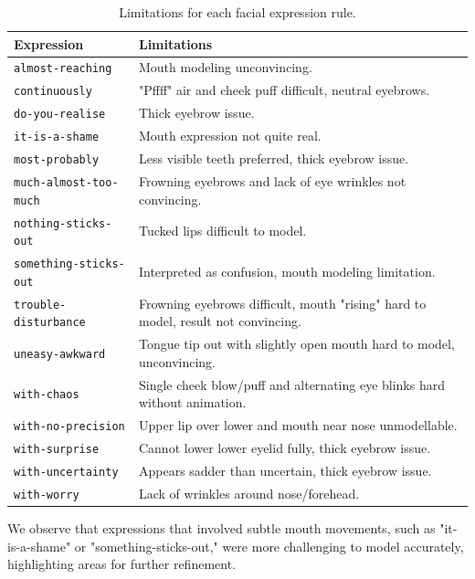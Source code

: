 \documentclass[../../main.tex]{subfiles}
\begin{document}
\begin{table}
    \centering
    \begin{tabular}{|l|p{8cm}|}
    \hline
    \textbf{Expression} & \textbf{Limitations} \\
    \hline
    \texttt{almost-reaching} & Mouth modeling unconvincing. \\
    \hline
    \texttt{continuously} & "Pffff" air and cheek puff difficult, neutral eyebrows. \\
    \hline
    \texttt{do-you-realise} & Thick eyebrow issue. \\
    \hline
    \texttt{it-is-a-shame} & Mouth expression not quite real. \\
    \hline
    \texttt{most-probably} & Less visible teeth preferred, thick eyebrow issue. \\
    \hline
    \texttt{much-almost-too-much} & Frowning eyebrows and lack of eye wrinkles not convincing. \\
    \hline
    \texttt{nothing-sticks-out} & Tucked lips difficult to model. \\
    \hline
   \texttt{something-sticks-out} & Interpreted as confusion, mouth modeling limitation. \\
    \hline
    \texttt{trouble-disturbance} & Frowning eyebrows difficult, mouth "rising" hard to model, result not convincing. \\
    \hline
    \texttt{uneasy-awkward} & Tongue tip out with slightly open mouth hard to model, unconvincing. \\
    \hline
    \texttt{with-chaos} & Single cheek blow/puff and alternating eye blinks hard without animation. \\
    \hline
    \texttt{with-no-precision} & Upper lip over lower and mouth near nose unmodellable. \\
    \hline
    \texttt{with-surprise} & Cannot lower lower eyelid fully, thick eyebrow issue. \\
    \hline
    \texttt{with-uncertainty} & Appears sadder than uncertain, thick eyebrow issue. \\
    \hline
    \texttt{with-worry} & Lack of wrinkles around nose/forehead. \\
    \hline
    \end{tabular}
    \caption{Limitations for each facial expression rule.}
    \label{tab:facial_expressions_evaluation}
\end{table}

We observe that expressions that involved subtle mouth movements, such as "it-is-a-shame" or "something-sticks-out," were more challenging to model accurately, highlighting areas for further refinement.
\end{document}
